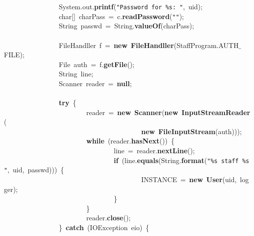 \mbox{}\ \ \ \ \ \ \ \ \ \ \ \ \ \ \ \ System.out.\textbf{printf}(\texttt{"{}Password\ for\ \%s:\ "{}},\ uid); \\
\mbox{}\ \ \ \ \ \ \ \ \ \ \ \ \ \ \ \ char[]\ charPass\ =\ c.\textbf{readPassword}(\texttt{"{}"{}}); \\
\mbox{}\ \ \ \ \ \ \ \ \ \ \ \ \ \ \ \ String\ passwd\ =\ String.\textbf{valueOf}(charPass); \\
\mbox{} \\
\mbox{}\ \ \ \ \ \ \ \ \ \ \ \ \ \ \ \ FileHandller\ f\ =\ \textbf{new}\ \textbf{FileHandller}(StaffProgram.AUTH$\_$FILE); \\
\mbox{}\ \ \ \ \ \ \ \ \ \ \ \ \ \ \ \ File\ auth\ =\ f.\textbf{getFile}(); \\
\mbox{}\ \ \ \ \ \ \ \ \ \ \ \ \ \ \ \ String\ line; \\
\mbox{}\ \ \ \ \ \ \ \ \ \ \ \ \ \ \ \ Scanner\ reader\ =\ \textbf{null}; \\
\mbox{} \\
\mbox{}\ \ \ \ \ \ \ \ \ \ \ \ \ \ \ \ \textbf{try}\ \{ \\
\mbox{}\ \ \ \ \ \ \ \ \ \ \ \ \ \ \ \ \ \ \ \ \ \ \ \ reader\ =\ \textbf{new}\ \textbf{Scanner}(\textbf{new}\ \textbf{InputStreamReader}( \\
\mbox{}\ \ \ \ \ \ \ \ \ \ \ \ \ \ \ \ \ \ \ \ \ \ \ \ \ \ \ \ \ \ \ \ \ \ \ \ \ \ \ \ \textbf{new}\ \textbf{FileInputStream}(auth))); \\
\mbox{}\ \ \ \ \ \ \ \ \ \ \ \ \ \ \ \ \ \ \ \ \ \ \ \ \textbf{while}\ (reader.\textbf{hasNext}())\ \{ \\
\mbox{}\ \ \ \ \ \ \ \ \ \ \ \ \ \ \ \ \ \ \ \ \ \ \ \ \ \ \ \ \ \ \ \ line\ =\ reader.\textbf{nextLine}(); \\
\mbox{}\ \ \ \ \ \ \ \ \ \ \ \ \ \ \ \ \ \ \ \ \ \ \ \ \ \ \ \ \ \ \ \ \textbf{if}\ (line.\textbf{equals}(String.\textbf{format}(\texttt{"{}\%s\ staff\ \%s"{}},\ uid,\ passwd)))\ \{ \\
\mbox{}\ \ \ \ \ \ \ \ \ \ \ \ \ \ \ \ \ \ \ \ \ \ \ \ \ \ \ \ \ \ \ \ \ \ \ \ \ \ \ \ INSTANCE\ =\ \textbf{new}\ \textbf{User}(uid,\ logger); \\
\mbox{}\ \ \ \ \ \ \ \ \ \ \ \ \ \ \ \ \ \ \ \ \ \ \ \ \ \ \ \ \ \ \ \ \} \\
\mbox{}\ \ \ \ \ \ \ \ \ \ \ \ \ \ \ \ \ \ \ \ \ \ \ \ \} \\
\mbox{}\ \ \ \ \ \ \ \ \ \ \ \ \ \ \ \ \ \ \ \ \ \ \ \ reader.\textbf{close}(); \\
\mbox{}\ \ \ \ \ \ \ \ \ \ \ \ \ \ \ \ \}\ \textbf{catch}\ (IOException\ eio)\ \{ \\
